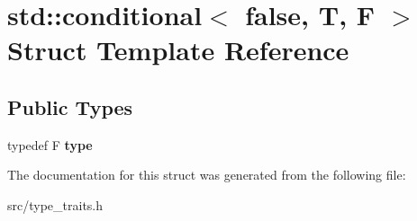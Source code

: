 \hypertarget{structstd_1_1conditional_3_01false_00_01T_00_01F_01_4}{}\section{std\+:\+:conditional$<$ false, T, F $>$ Struct Template Reference}
\label{structstd_1_1conditional_3_01false_00_01T_00_01F_01_4}
\subsection*{Public Types}
\begin{DoxyCompactItemize}
\item 
\hypertarget{structstd_1_1conditional_3_01false_00_01T_00_01F_01_4_a8307a0010d68b8c7f309a910bb6137fe}{}\label{structstd_1_1conditional_3_01false_00_01T_00_01F_01_4_a8307a0010d68b8c7f309a910bb6137fe} 
typedef F {\bfseries type}
\end{DoxyCompactItemize}


The documentation for this struct was generated from the following file\+:\begin{DoxyCompactItemize}
\item 
src/type\+\_\+traits.\+h\end{DoxyCompactItemize}
